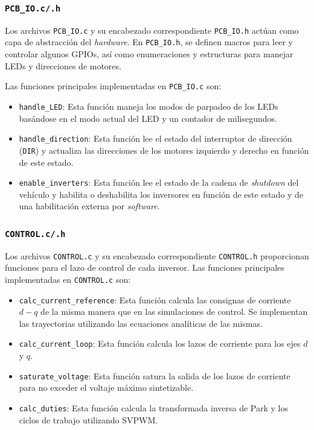 \subsubsection{\texttt{PCB\_IO.c/.h}}

Los archivos \texttt{PCB\_IO.c} y su encabezado correspondiente \texttt{PCB\_IO.h} actúan como capa de abstracción del \textit{hardware}. En \texttt{PCB\_IO.h}, se definen macros para leer y controlar algunos GPIOs, así como enumeraciones y estructuras para manejar LEDs y direcciones de motores.

Las funciones principales implementadas en \texttt{PCB\_IO.c} son:

\begin{itemize}
	\item \texttt{handle\_LED}: Esta función maneja los modos de parpadeo de los LEDs basándose en el modo actual del LED y un contador de milisegundos.
	\item \texttt{handle\_direction}: Esta función lee el estado del interruptor de dirección (\texttt{DIR}) y actualiza las direcciones de los motores izquierdo y derecho en función de este estado.
	\item \texttt{enable\_inverters}: Esta función lee el estado de la cadena de \textit{shutdown} del vehículo y habilita o deshabilita los inversores en función de este estado y de una habilitación externa por \textit{software}.
\end{itemize}

\subsubsection{\texttt{CONTROL.c/.h}}

Los archivos \texttt{CONTROL.c} y su encabezado correspondiente \texttt{CONTROL.h} proporcionan funciones para el lazo de control de cada inversor. Las funciones principales implementadas en \texttt{CONTROL.c} son:

\begin{itemize}
	\item \texttt{calc\_current\_reference}: Esta función calcula las consignas de corriente $d - q$ de la misma manera que en las simulaciones de control. Se implementan las trayectorias utilizando las ecuaciones analíticas de las mismas.
	\item \texttt{calc\_current\_loop}: Esta función calcula los lazos de corriente para los ejes $d$ y $q$.
	\item \texttt{saturate\_voltage}: Esta función satura la salida de los lazos de corriente para no exceder el voltaje máximo sintetizable.
	\item \texttt{calc\_duties}: Esta función calcula la transformada inversa de Park y los ciclos de trabajo utilizando SVPWM.
\end{itemize}

